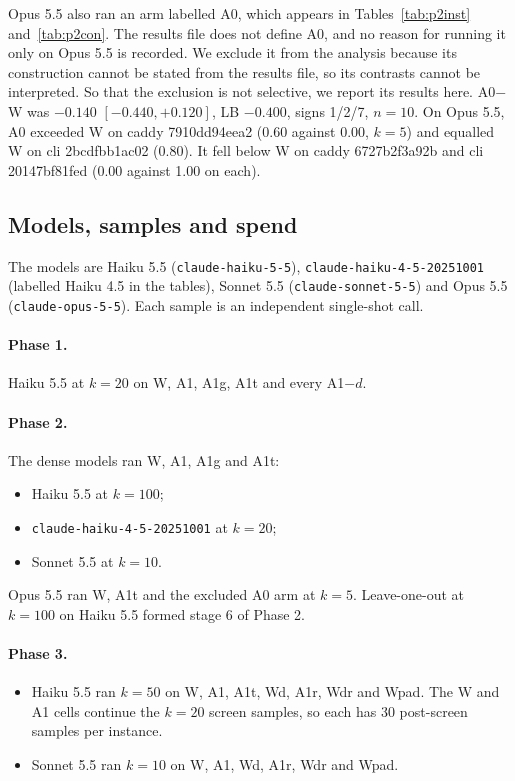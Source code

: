 \documentclass[10pt]{article}
\begin{document}
Opus 5.5 also ran an arm labelled A0, which appears in Tables~\ref{tab:p2inst} and~\ref{tab:p2con}. The results file does not define A0, and no reason for running it only on Opus 5.5 is recorded. We exclude it from the analysis because its construction cannot be stated from the results file, so its contrasts cannot be interpreted. So that the exclusion is not selective, we report its results here. A0$-$W was $-0.140$ $[-0.440, +0.120]$, LB $-0.400$, signs 1/2/7, $n=10$. On Opus 5.5, A0 exceeded W on caddy 7910dd94eea2 (0.60 against 0.00, $k=5$) and equalled W on cli 2bcdfbb1ac02 (0.80). It fell below W on caddy 6727b2f3a92b and cli 20147bf81fed (0.00 against 1.00 on each).

\subsection{Models, samples and spend}

The models are Haiku 5.5 (\texttt{claude-haiku-5-5}), \texttt{claude-haiku-4-5-20251001} (labelled Haiku 4.5 in the tables), Sonnet 5.5 (\texttt{claude-sonnet-5-5}) and Opus 5.5 (\texttt{claude-opus-5-5}). Each sample is an independent single-shot call.

\paragraph{Phase 1.} Haiku 5.5 at $k=20$ on W, A1, A1g, A1t and every A1$-d$.

\paragraph{Phase 2.} The dense models ran W, A1, A1g and A1t:
\begin{itemize}
\item Haiku 5.5 at $k=100$;
\item \texttt{claude-haiku-4-5-20251001} at $k=20$;
\item Sonnet 5.5 at $k=10$.
\end{itemize}
Opus 5.5 ran W, A1t and the excluded A0 arm at $k=5$. Leave-one-out at $k=100$ on Haiku 5.5 formed stage 6 of Phase 2.

\paragraph{Phase 3.}
\begin{itemize}
\item Haiku 5.5 ran $k=50$ on W, A1, A1t, Wd, A1r, Wdr and Wpad. The W and A1 cells continue the $k=20$ screen samples, so each has 30 post-screen samples per instance.
\item Sonnet 5.5 ran $k=10$ on W, A1, Wd, A1r, Wdr and Wpad.
\end{itemize}
\end{document}
